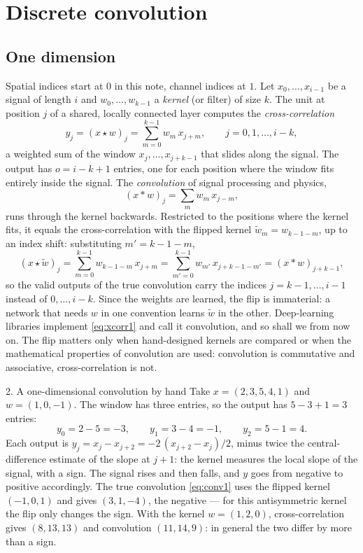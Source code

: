 \documentclass[11pt]{article}
\begin{document}
\section{Discrete convolution}\label{sec:conv}

\subsection{One dimension}

Spatial indices start at $0$ in this note, channel indices at $1$. Let $x_0, \dots, x_{i-1}$ be a signal of length $i$ and $w_0, \dots, w_{k-1}$ a
\emph{kernel} (or filter) of size $k$. The unit at position $j$ of a shared, locally connected layer computes the
\emph{cross-correlation}
\begin{equation}\label{eq:xcorr1}
  y_j = (x \star w)_j = \sum_{m=0}^{k-1} w_m\, x_{j+m}, \qquad j = 0, 1, \dots, i - k ,
\end{equation}
a weighted sum of the window $x_j, \dots, x_{j+k-1}$ that slides along the signal. The output has $o = i - k + 1$
entries, one for each position where the window fits entirely inside the signal. The \emph{convolution} of signal
processing and physics,
\begin{equation}\label{eq:conv1}
  (x * w)_j = \sum_m w_m\, x_{j-m},
\end{equation}
runs through the kernel backwards. Restricted to the positions where the kernel fits, it equals the cross-correlation
with the flipped kernel $\tilde w_m = w_{k-1-m}$, up to an index shift: substituting $m' = k - 1 - m$,
\[
  (x \star \tilde w)_j = \sum_{m=0}^{k-1} w_{k-1-m}\, x_{j+m} = \sum_{m'=0}^{k-1} w_{m'}\, x_{j+k-1-m'} = (x * w)_{j+k-1} ,
\]
so the valid outputs of the true convolution carry the indices $j = k - 1, \dots, i - 1$ instead of $0, \dots, i - k$. Since the weights are learned, the flip is immaterial: a network that
needs $w$ in one convention learns $\tilde w$ in the other. Deep-learning libraries implement \eqref{eq:xcorr1} and
call it convolution, and so shall we from now on. The flip matters only when hand-designed kernels are compared or
when the mathematical properties of convolution are used: convolution is commutative and associative, cross-correlation
is not.

\begin{worked}{2. A one-dimensional convolution by hand}
Take $x = (2, 3, 5, 4, 1)$ and $w = (1, 0, -1)$. The window has three entries, so the output has $5 - 3 + 1 = 3$ entries:
\[
  y_0 = 2 - 5 = -3, \qquad y_1 = 3 - 4 = -1, \qquad y_2 = 5 - 1 = 4 .
\]
Each output is $y_j = x_j - x_{j+2} = -2\,(x_{j+2} - x_j)/2$, minus twice the central-difference estimate of the slope at
$j + 1$: the kernel measures the local slope of the signal, with
a sign. The signal rises and then falls, and $y$ goes from negative to positive accordingly. The true convolution
\eqref{eq:conv1} uses the flipped kernel $(-1, 0, 1)$ and gives $(3, 1, -4)$, the negative --- for this antisymmetric
kernel the flip only changes the sign. With the kernel $w = (1, 2, 0)$, cross-correlation gives $(8, 13, 13)$ and
convolution $(11, 14, 9)$: in general the two differ by more than a sign.
\end{worked}
\end{document}
